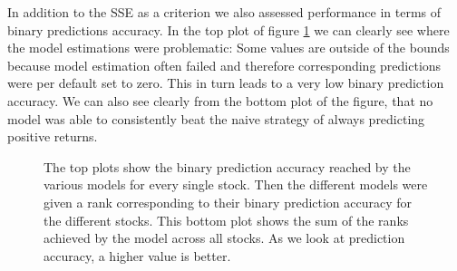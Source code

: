 In addition to the SSE as a criterion we also assessed performance in terms of binary predictions accuracy. In the top plot of figure \ref{fig:models_ranked_binary} we can clearly see where the model estimations were problematic: Some values are outside of the bounds because model estimation often failed and therefore corresponding predictions were per default set to zero. This in turn leads to a very low binary prediction accuracy. We can also see clearly from the bottom plot of the figure, that no model was able to consistently beat the naive strategy of always predicting positive returns.

\begin{figure}[h!]
    \centering
    \begin{adjustbox}{width = 0.95\linewidth}
    
    \end{adjustbox}
    \vspace{1ex}
    \begin{adjustbox}{width = 0.95\linewidth}
    
    \end{adjustbox}
    \caption{The top plots show the binary prediction accuracy reached by the various models for every single stock. Then the different models were given a rank corresponding to their binary prediction accuracy for the different stocks. This bottom plot shows the sum of the ranks achieved by the model across all stocks. As we look at prediction accuracy, a higher value is better.}
    \label{fig:models_ranked_binary}
\end{figure}{}